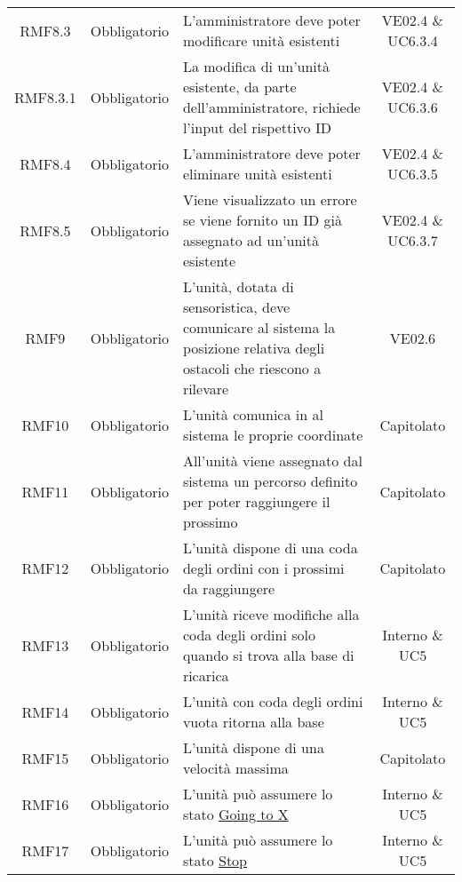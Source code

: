 \begin{longtable}[h!] { c c m{8cm} c}
		RMF8.3 & Obbligatorio & L'amministratore deve poter modificare unità esistenti & VE02.4 \& UC6.3.4 \\
		
		RMF8.3.1 & Obbligatorio & La modifica di un'unità esistente, da parte dell'amministratore, richiede l'input  del rispettivo ID & VE02.4 \& UC6.3.6 \\
		
		RMF8.4 & Obbligatorio & L'amministratore deve poter eliminare unità esistenti & VE02.4 \& UC6.3.5 \\
		
		RMF8.5 & Obbligatorio & Viene visualizzato un errore se viene fornito un ID già assegnato ad un'unità esistente & VE02.4 \& UC6.3.7 \\
		
		RMF9 & Obbligatorio & L'unità, dotata di sensoristica, deve comunicare al sistema la posizione relativa degli ostacoli che riescono a rilevare & VE02.6 \\
		
		RMF10 & Obbligatorio & L'unità comunica in \glock{real-time} al sistema le proprie coordinate & Capitolato \\
		
		RMF11 & Obbligatorio & All'unità viene assegnato dal sistema un percorso definito per poter raggiungere il prossimo \glock{POI} & Capitolato \\
		
		RMF12 & Obbligatorio & L'unità dispone di una coda degli ordini con i prossimi \glock{POI} da raggiungere & Capitolato \\
		
		RMF13 & Obbligatorio & L'unità riceve modifiche alla coda degli ordini solo quando si trova alla base di ricarica & Interno \& UC5 \\
		
		RMF14 & Obbligatorio & L'unità con coda degli ordini vuota ritorna alla base & Interno \& UC5 \\
		
		RMF15 & Obbligatorio & L'unità dispone di una velocità massima & Capitolato \\
		
		RMF16 & Obbligatorio & L'unità può assumere lo stato \underline{Going to X} & Interno \& UC5 \\
		
		RMF17 & Obbligatorio & L'unità può assumere lo stato \underline{Stop} & Interno \& UC5 \\
		

\end{longtable}
